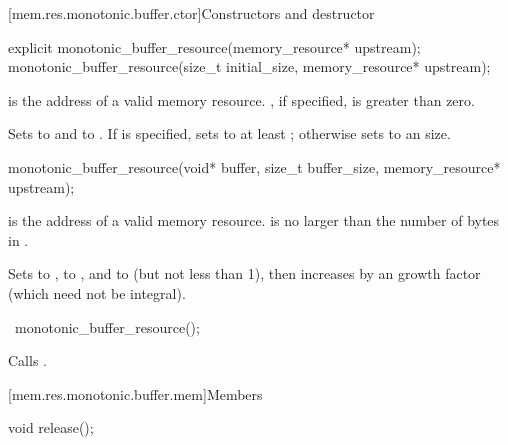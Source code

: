 [mem.res.monotonic.buffer.ctor]{Constructors and destructor}

%
\begin{itemdecl}
explicit monotonic_buffer_resource(memory_resource* upstream);
monotonic_buffer_resource(size_t initial_size, memory_resource* upstream);
\end{itemdecl}

\begin{itemdescr}
\pnum
\expects
{} is the address of a valid memory resource.
, if specified, is greater than zero.

\pnum
\effects
Sets  to  and
 to .
If  is specified,
sets  to at least ;
otherwise sets  to an
 size.
\end{itemdescr}

%
\begin{itemdecl}
monotonic_buffer_resource(void* buffer, size_t buffer_size, memory_resource* upstream);
\end{itemdecl}

\begin{itemdescr}
\pnum
\expects
{} is the address of a valid memory resource.
 is no larger than the number of bytes in .

\pnum
\effects
Sets  to ,
 to , and
 to  (but not less than 1),
then increases 
by an  growth factor (which need not be integral).
\end{itemdescr}

%
\begin{itemdecl}
~monotonic_buffer_resource();
\end{itemdecl}

\begin{itemdescr}
\pnum
\effects
Calls .
\end{itemdescr}


[mem.res.monotonic.buffer.mem]{Members}

%
\begin{itemdecl}
void release();
\end{itemdecl}

